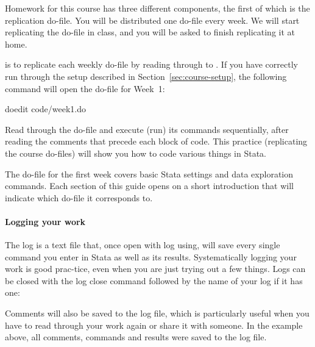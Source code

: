 Homework for this course has three different components, the first of which is the replication do-file. You will be distributed one do-file every week. We will start replicating the do-file in class, and you will be asked to finish replicating it at home.%

 is to replicate each weekly do-file by reading through  to . If you have correctly run through the setup described in Section~\ref{sec:course-setup}, the following command will open the do-file for Week~1:%

\begin{docspec}
  doedit code/week1.do
\end{docspec}

Read through the do-file and execute (run) its commands sequentially, after reading the comments that precede each block of code. This practice (replicating the course do-files) will show you how to code various things in Stata.%

 The do-file for the first week covers basic Stata settings and data exploration commands. Each section of this guide opens on a short introduction that will indicate which do-file it corresponds to.%

\paragraph{Logging your work}

The log is a text file that, once open with log using, will save every single command you enter in Stata as well as its results. Systematically logging your work is good prac-tice, even when you are just trying out a few things. Logs can be closed with the log close command followed by the name of your log if it has one:

Comments will also be saved to the log file, which is particularly useful when you have to read through your work again or share it with someone. In the example above, all comments, commands and results were saved to the log file.


